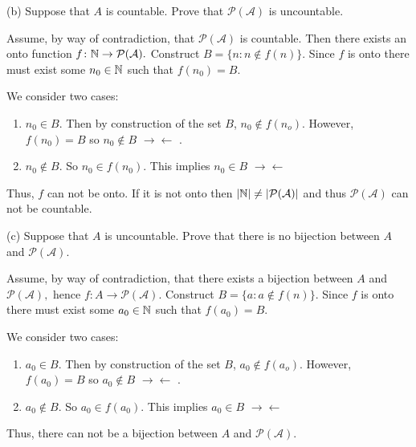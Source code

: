 \documentclass{report}
\newcommand{\contra}{
$\rightarrow\!\leftarrow$
}
\begin{document}
\bigskip
(b) Suppose that $A$ is countable. Prove that $\mathcal{P}(\mathcal{A})$ is uncountable.
\bigskip
\par
\sol

Assume, by way of contradiction, that $\mathcal{P}(\mathcal{A})$ is countable. Then there exists an onto function $f\colon \NN \rightarrow \mathcal{P}(\mathcal{A}).$ Construct $B = \{n : n \not\in f(n)\}.$  Since $f$ is onto there must exist some $n_0 \in \NN$ such that $f(n_0) = B.$

We consider two cases:
\begin{enumerate}
  \item $n_0 \in B.$ Then by construction of the set $B$, $n_0 \not\in f(n_o).$ However, $f(n_0)=B$ so $n_0 \not\in B $ \contra.
  \item $n_0 \not\in B$. So $n_0 \in f(n_0).$ This implies $n_0 \in B$ \contra
\end{enumerate}

Thus, $f$ can not be onto. If it is not onto then $|\NN| \not= |\mathcal{P}(\mathcal{A})|$ and thus $\mathcal{P}(\mathcal{A})$ can not be countable.
\bigskip

(c) Suppose that $A$ is uncountable. Prove that there is no bijection between $A$ and $\mathcal{P}(\mathcal{A})$.
\bigskip
\begin{myproof}
    
Assume, by way of contradiction, that there exists a bijection between $A$ and $\mathcal{P}(\mathcal{A}),$ hence $f\colon A \rightarrow \mathcal{P}(\mathcal{A}).$ Construct $B = \{a : a \not\in f(n)\}.$  Since $f$ is onto there must exist some $a_0 \in \NN$ such that $f(a_0) = B.$

We consider two cases:
\begin{enumerate}
  \item $a_0 \in B.$ Then by construction of the set $B$, $a_0 \not\in f(a_o).$ However, $f(a_0)=B$ so $a_0 \not\in B $ \contra.
  \item $a_0 \not\in B$. So $a_0 \in f(a_0).$ This implies $a_0 \in B$ \contra
\end{enumerate}

Thus, there can not be a bijection  between  $A$ and $\mathcal{P}(\mathcal{A}).$ 

\end{myproof}
\end{document}
